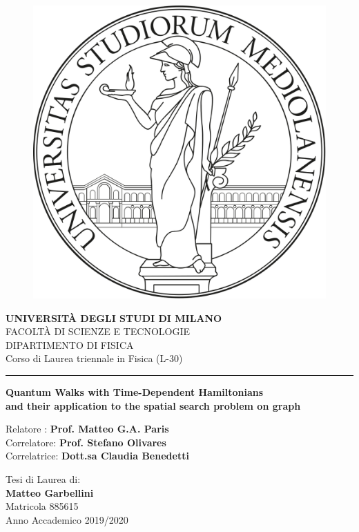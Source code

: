\begin{titlepage}
    \begin{center}
        \begin{figure}[hbt!]
             \centering
             \includegraphics[width=0.3 \textwidth]{./figures/unimi_logo_tesi}
        \end{figure}
        \textbf{\Large{UNIVERSIT\`A DEGLI STUDI DI MILANO}}\\
        \vspace{12pt}
        \Large{FACOLT\`A DI SCIENZE E TECNOLOGIE}\\
        \Large{DIPARTIMENTO DI FISICA}\\
        \Large{Corso di Laurea triennale in Fisica (L-30)}
        \vspace{24pt}
        \hrule
        \vspace{24pt}
        \textbf{\Large{Quantum Walks with Time-Dependent Hamiltonians}\\ \large{and their application to the spatial search problem on graph}} \\

    \end{center}
    \vspace{120pt}
    \begin{flushleft}
        Relatore : \textbf{Prof. Matteo G.A. Paris}\\
        Correlatore: \textbf{Prof. Stefano Olivares}\\
        Correlatrice: \textbf{Dott.sa Claudia Benedetti}
    \end{flushleft}
    \vspace{12pt}
    \begin{flushright}
        Tesi di Laurea di:\\
        \textbf{Matteo Garbellini}\\
        Matricola 885615\\
        Anno Accademico 2019/2020
    \end{flushright}
\end{titlepage}
\newpage